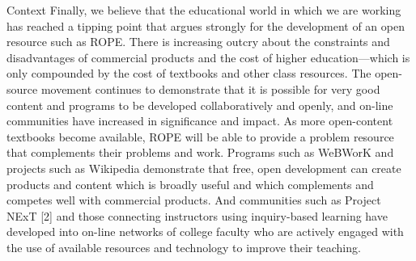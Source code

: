 \documentclass[11pt]{article}
\begin{document}
\begin{section}{Context}
Finally, we believe that the educational world in which we are working has
reached a tipping point that argues strongly for the development of an open
resource such as ROPE.  There is increasing outcry about the constraints
and disadvantages of commercial products and the cost of higher
education---which is only compounded by the cost of textbooks and other
class resources.  The open-source movement continues to demonstrate that
it is possible for very good content and programs to be
developed collaboratively and openly, and on-line communities have
increased in significance and impact. 
As more
open-content textbooks become available, ROPE will be able to provide a
problem resource that complements their problems and work.  Programs such
as WeBWorK and projects such as Wikipedia demonstrate that free, open
development can create products and content which is broadly useful and
which complements and competes well with commercial products.  And
communities such as Project NExT [2] and those connecting instructors
using inquiry-based learning have developed into on-line networks of
college faculty who are actively engaged with the use of available
resources and technology to improve their teaching.

\end{section}
\end{document}
